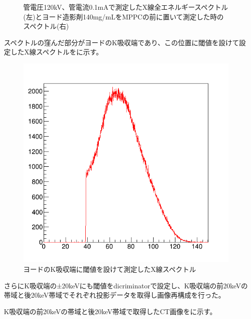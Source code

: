 \begin{figure}[H]
\begin{minipage}{0.5\hsize}
\begin{center}
  \end{center}
 \end{minipage}
 \begin{center}
  \caption{管電圧120kV、管電流0.1mAで測定したX線全エネルギースペクトル(左)とヨード造影剤140mg/mLをMPPCの前に置いて測定した時のスペクトル(右)}
  \label{fig:Iodine_spectrums}
  \end{center}
\end{figure}

スペクトルの窪んだ部分がヨードのK吸収端であり、この位置に閾値を設けて設定したX線スペクトルをに示す。\\

\begin{figure}[H]
 \begin{center}
 \includegraphics[bb=0.000000 0.000000 596.000000 574.000000,width=0.5\hsize]{image2/chapter5/over_I_kedge_100sec.png} 
 \end{center}
 \caption{ヨードのK吸収端に閾値を設けて測定したX線スペクトル}
 \label{fig:over_I_kedge}
\end{figure}

さらにK吸収端の±20keVにも閾値をdicriminatorで設定し、K吸収端の前20keVの帯域と後20keV帯域でそれぞれ投影データを取得し画像再構成を行った。

K吸収端の前20keVの帯域と後20keV帯域で取得したCT画像をに示す。

